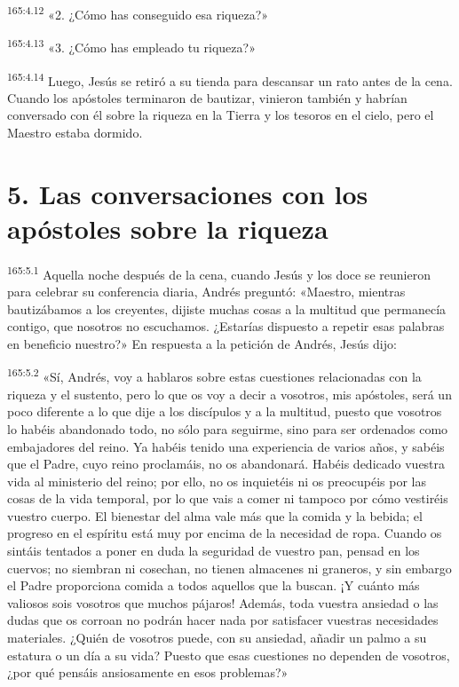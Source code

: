 \par 
\textsuperscript{165:4.12} «2. ¿Cómo has conseguido esa riqueza?»

\par 
\textsuperscript{165:4.13} «3. ¿Cómo has empleado tu riqueza?»

\par 
\textsuperscript{165:4.14} Luego, Jesús se retiró a su tienda para descansar un rato antes de la cena. Cuando los apóstoles terminaron de bautizar, vinieron también y habrían conversado con él sobre la riqueza en la Tierra y los tesoros en el cielo, pero el Maestro estaba dormido.

\section*{5. Las conversaciones con los apóstoles sobre la riqueza}
\par 
\textsuperscript{165:5.1} Aquella noche después de la cena, cuando Jesús y los doce se reunieron para celebrar su conferencia diaria, Andrés preguntó: «Maestro, mientras bautizábamos a los creyentes, dijiste muchas cosas a la multitud que permanecía contigo, que nosotros no escuchamos. ¿Estarías dispuesto a repetir esas palabras en beneficio nuestro?» En respuesta a la petición de Andrés, Jesús dijo:

\par 
\textsuperscript{165:5.2} «Sí, Andrés, voy a hablaros sobre estas cuestiones relacionadas con la riqueza y el sustento, pero lo que os voy a decir a vosotros, mis apóstoles, será un poco diferente a lo que dije a los discípulos y a la multitud, puesto que vosotros lo habéis abandonado todo, no sólo para seguirme, sino para ser ordenados como embajadores del reino. Ya habéis tenido una experiencia de varios años, y sabéis que el Padre, cuyo reino proclamáis, no os abandonará. Habéis dedicado vuestra vida al ministerio del reino; por ello, no os inquietéis ni os preocupéis por las cosas de la vida temporal, por lo que vais a comer ni tampoco por cómo vestiréis vuestro cuerpo. El bienestar del alma vale más que la comida y la bebida; el progreso en el espíritu está muy por encima de la necesidad de ropa. Cuando os sintáis tentados a poner en duda la seguridad de vuestro pan, pensad en los cuervos; no siembran ni cosechan, no tienen almacenes ni graneros, y sin embargo el Padre proporciona comida a todos aquellos que la buscan. ¡Y cuánto más valiosos sois vosotros que muchos pájaros! Además, toda vuestra ansiedad o las dudas que os corroan no podrán hacer nada por satisfacer vuestras necesidades materiales. ¿Quién de vosotros puede, con su ansiedad, añadir un palmo a su estatura o un día a su vida? Puesto que esas cuestiones no dependen de vosotros, ¿por qué pensáis ansiosamente en esos problemas?»

